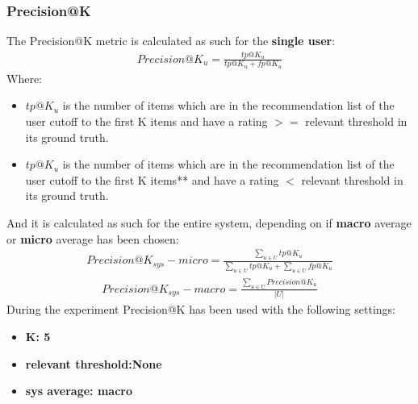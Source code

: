 \documentclass[11pt]{article}
\begin{document}
\subsubsection{Precision@K}\label{subsubsec:prec-k}
The Precision@K metric is calculated as such for the \textbf{single user}:
\hfill\break
\hfill\break
    \[
      \begin{gathered}
          Precision@K_u = \frac{tp@K_u}{tp@K_u + fp@K_u}
      \end{gathered}
    \]
\hfill\break
\hfill\break
    Where:
\begin{itemize}
    \item $tp@K_u$ is the number of items which are in the recommendation list of the user
      cutoff to the first K items and have a rating $>=$ relevant threshold in its ground truth.
    \item $tp@K_u$ is the number of items which are in the recommendation list of the user
      cutoff to the first K items** and have a rating $<$ relevant threshold in its ground truth.
\end{itemize}
\hfill\break
\hfill\break
And it is calculated as such for the entire system, depending on if \textbf{macro} average or \textbf{micro} average
has been chosen:
\hfill\break
\hfill\break
   \[
      \begin{gathered}
          Precision@K_{sys} - micro = \frac{\sum_{u \in U} tp@K_u}{\sum_{u \in U} tp@K_u + \sum_{u \in U} fp@K_u}
      \end{gathered}
   \]
\hfill\break
\hfill\break
    \[
      \begin{gathered}
          Precision@K_{sys} - macro = \frac{\sum_{u \in U} Precision@K_u}{|U|}
      \end{gathered}
    \]
\hfill\break
\hfill\break
During the experiment Precision@K has been used with the following settings:
\begin{itemize}
    \item \textbf{K: 5 }
    \item \textbf{relevant threshold:None }
    \item \textbf{sys average: macro }
\end{itemize}
\hfill\break
\hfill\break

\end{document}
